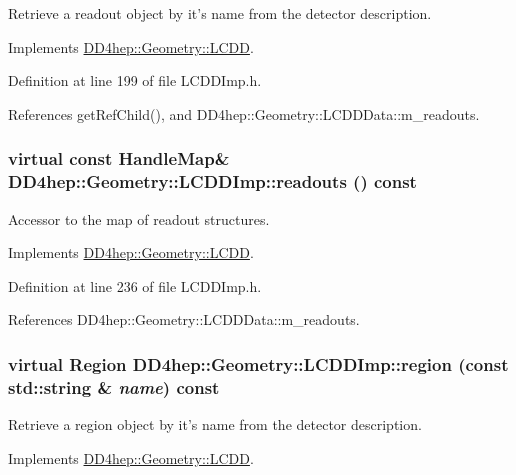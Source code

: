 Retrieve a readout object by it's name from the detector description. 

Implements \hyperlink{class_d_d4hep_1_1_geometry_1_1_l_c_d_d_aa29f75fba9942edd7f73226a11c9598e}{DD4hep::Geometry::LCDD}.

Definition at line 199 of file LCDDImp.h.

References getRefChild(), and DD4hep::Geometry::LCDDData::m\_\-readouts.\hypertarget{class_d_d4hep_1_1_geometry_1_1_l_c_d_d_imp_a0064b7e246b1e505e1b6d14483172325}{
\subsubsection[{readouts}]{\setlength{\rightskip}{0pt plus 5cm}virtual const {\bf HandleMap}\& DD4hep::Geometry::LCDDImp::readouts () const}}
\label{class_d_d4hep_1_1_geometry_1_1_l_c_d_d_imp_a0064b7e246b1e505e1b6d14483172325}


Accessor to the map of readout structures. 

Implements \hyperlink{class_d_d4hep_1_1_geometry_1_1_l_c_d_d_a5c815f21643ebb5cce9d1d1e71772431}{DD4hep::Geometry::LCDD}.

Definition at line 236 of file LCDDImp.h.

References DD4hep::Geometry::LCDDData::m\_\-readouts.\hypertarget{class_d_d4hep_1_1_geometry_1_1_l_c_d_d_imp_a4588edf168376c44fce31c62a92b48df}{
\subsubsection[{region}]{\setlength{\rightskip}{0pt plus 5cm}virtual {\bf Region} DD4hep::Geometry::LCDDImp::region (const std::string \& {\em name}) const}}
\label{class_d_d4hep_1_1_geometry_1_1_l_c_d_d_imp_a4588edf168376c44fce31c62a92b48df}


Retrieve a region object by it's name from the detector description. 

Implements \hyperlink{class_d_d4hep_1_1_geometry_1_1_l_c_d_d_adbe06759881707fe995472c03810c0ff}{DD4hep::Geometry::LCDD}.

